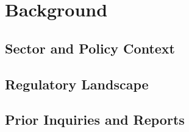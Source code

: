 \chapter{Background}
\label{ch:background}


\section{Sector and Policy Context}
\label{sec:background:context}

\lipsum[1-2]

\section{Regulatory Landscape}
\label{sec:background:regulation}

\lipsum[3]

\section{Prior Inquiries and Reports}
\label{sec:background:prior}

\lipsum[4]
